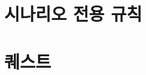 \documentclass{report}
\begin{document}
	\pagebreak \hypertarget{scenario-rule}{}
	\section{시나리오 전용 규칙}
	
	\pagebreak \hypertarget{quest}{}
	\section{퀘스트}
	
\end{document}
